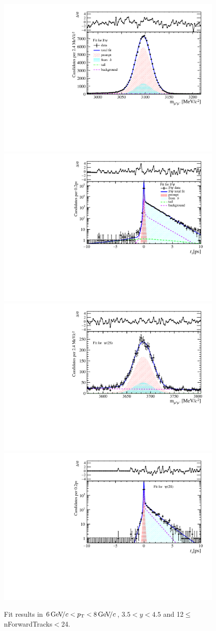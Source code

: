 \begin{figure}[H]
\begin{center}
\includegraphics[width=0.47\linewidth]{pdf/Jpsi/drawmassF/n2y3pt4.pdf}
\includegraphics[width=0.47\linewidth]{pdf/Jpsi/2DFitF/n2y3pt4.pdf}
\vspace*{-0.5cm}
\includegraphics[width=0.47\linewidth]{pdf/Psi2S/drawmassF/n2y3pt4.pdf}
\includegraphics[width=0.47\linewidth]{pdf/Psi2S/2DFitF/n2y3pt4.pdf}
\vspace*{-0.5cm}
\end{center}
\caption{Fit results in $6\text{\,Ge\kern -0.1em V\!/}c<p_{\mathrm{T}}<8\text{\,Ge\kern -0.1em V\!/}c$, $3.5<y<4.5$ and 12$\leq$nForwardTracks$<$24.}
\label{Fitn2y3pt4}
\end{figure}
